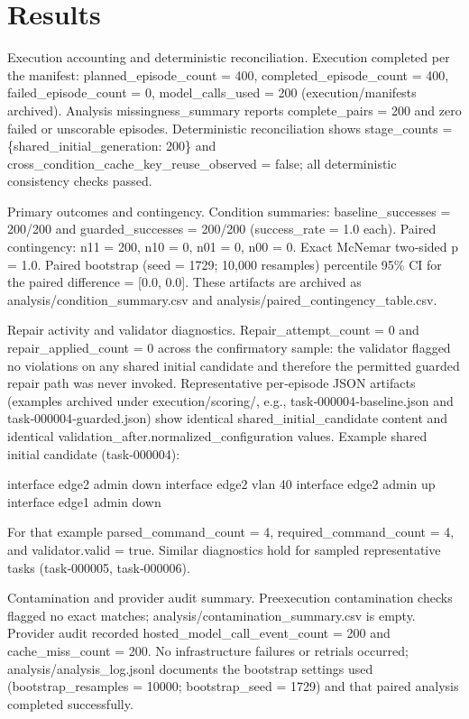 \documentclass[conference]{IEEEtran}
\begin{document}
\section{Results}
Execution accounting and deterministic reconciliation. Execution completed per the manifest: planned\_episode\_count = 400, completed\_episode\_count = 400, failed\_episode\_count = 0, model\_calls\_used = 200 (execution/manifests archived). Analysis missingness\_summary reports complete\_pairs = 200 and zero failed or unscorable episodes. Deterministic reconciliation shows stage\_counts = \{shared\_initial\_generation: 200\} and cross\_condition\_cache\_key\_reuse\_observed = false; all deterministic consistency checks passed.

Primary outcomes and contingency. Condition summaries: baseline\_successes = 200/200 and guarded\_successes = 200/200 (success\_rate = 1.0 each). Paired contingency: n11 = 200, n10 = 0, n01 = 0, n00 = 0. Exact McNemar two‑sided p = 1.0. Paired bootstrap (seed = 1729; 10,000 resamples) percentile 95\% CI for the paired difference = [0.0, 0.0]. These artifacts are archived as analysis/condition\_summary.csv and analysis/paired\_contingency\_table.csv.

Repair activity and validator diagnostics. Repair\_attempt\_count = 0 and repair\_applied\_count = 0 across the confirmatory sample: the validator flagged no violations on any shared initial candidate and therefore the permitted guarded repair path was never invoked. Representative per‑episode JSON artifacts (examples archived under execution/scoring/, e.g., task‑000004‑baseline.json and task‑000004‑guarded.json) show identical shared\_initial\_candidate content and identical validation\_after.normalized\_configuration values. Example shared initial candidate (task‑000004):

interface edge2 admin down
interface edge2 vlan 40
interface edge2 admin up
interface edge1 admin down

For that example parsed\_command\_count = 4, required\_command\_count = 4, and validator.valid = true. Similar diagnostics hold for sampled representative tasks (task‑000005, task‑000006).

Contamination and provider audit summary. Preexecution contamination checks flagged no exact matches; analysis/contamination\_summary.csv is empty. Provider audit recorded hosted\_model\_call\_event\_count = 200 and cache\_miss\_count = 200. No infrastructure failures or retrials occurred; analysis/analysis\_log.jsonl documents the bootstrap settings used (bootstrap\_resamples = 10000; bootstrap\_seed = 1729) and that paired analysis completed successfully.
\end{document}
